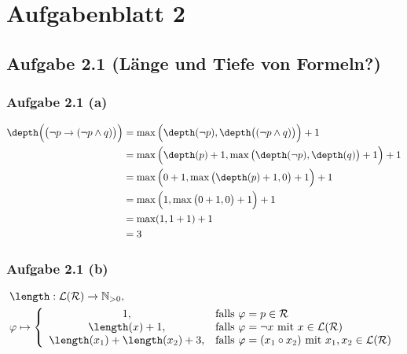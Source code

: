 
\section{Aufgabenblatt 2}
\subsection{Aufgabe 2.1 (Länge und Tiefe von Formeln?)}

\subsubsection{Aufgabe 2.1 (a)}
\begin{align*}
	\depth\Big(\big(\neg p\to(\neg p\wedge q)\big)\Big)
	&=\max\Big(\depth(\neg p),\depth\big((\neg p\wedge q)\big)\Big)+1\\
	&=\max\Big(\depth(p)+1,\max\big(\depth(\neg p),\depth(q)\big)+1\Big)+1\\
	&=\max\Big(0+1,\max\big(\depth(p)+1,0\big)+1\Big)+1\\
	&=\max\Big(1,\max\big(0+1,0\big)+1\Big)+1\\
	&=\max(1,1+1)+1\\
	&=3
\end{align*}

\subsubsection{Aufgabe 2.1 (b)}
\begin{align*}
	&\length:\mathcal{L}(\mathcal{R})\to\N_{>0},\qquad\\
	&\varphi\mapsto\left\lbrace\begin{array}{cl}
		1, & \falls \varphi=p\in\mathcal{R}\\
		\length(x) + 1, & \falls \varphi=\neg x\mit x\in\mathcal{L}(\mathcal{R})\\
		\length(x_1) + \length(x_2) + 3, & \falls \varphi=(x_1\circ x_2)\mit x_1,x_2\in\mathcal{L}(\mathcal{R})%
	\end{array}\right.
\end{align*}

